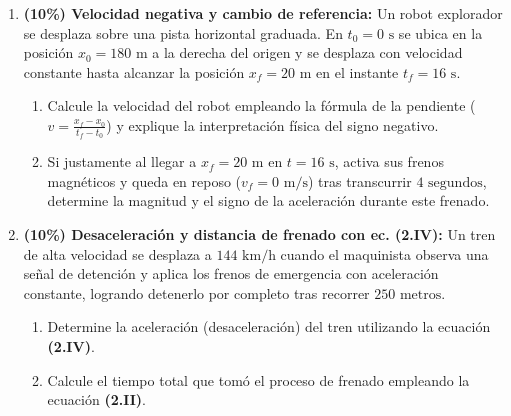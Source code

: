 \documentclass[11pt, letterpaper]{article}
\newif\ifmostrarrespuestas
\newcommand{\respuesta}[1]{
	\ifmostrarrespuestas
	\par\vspace{0.2cm}
	\begin{tcolorbox}[colback=blue!5!white, colframe=valblue, coltext=blue!80!black, boxrule=0.5pt, arc=1mm, left=2mm, right=2mm, top=1.5mm, bottom=1.5mm]
		\footnotesize \textbf{\textcolor{valblue}{Solución Paso a Paso (Docente):}} #1
	\end{tcolorbox}
	\vspace{0.2cm}
	\fi
}
\begin{document}
\begin{enumerate}[leftmargin=*, itemsep=0.6cm]
		\item \textbf{(10\%) Velocidad negativa y cambio de referencia:} Un robot explorador se desplaza sobre una pista horizontal graduada. En $t_0 = 0\text{ s}$ se ubica en la posición $x_0 = 180\text{ m}$ a la derecha del origen y se desplaza con velocidad constante hasta alcanzar la posición $x_f = 20\text{ m}$ en el instante $t_f = 16\text{ s}$.
		\begin{enumerate}[label=\alph*., itemsep=0.2cm]
			\item Calcule la velocidad del robot empleando la fórmula de la pendiente ($v = \frac{x_f - x_0}{t_f - t_0}$) y explique la interpretación física del signo negativo.
			\item Si justamente al llegar a $x_f = 20\text{ m}$ en $t = 16\text{ s}$, activa sus frenos magnéticos y queda en reposo ($v_f = 0\text{ m/s}$) tras transcurrir $4\text{ segundos}$, determine la magnitud y el signo de la aceleración durante este frenado.
		\end{enumerate}
		\respuesta{
			\textbf{a)} $v = \frac{20\text{ m} - 180\text{ m}}{16\text{ s} - 0\text{ s}} = \frac{-160\text{ m}}{16\text{ s}} = \mathbf{-10}\text{ \textbf{m/s}}$. El signo negativo indica que el robot avanza en sentido opuesto al eje positivo del sistema de referencia (regresando hacia el origen $x=0$).\\[0.1cm]
			\textbf{b)} Datos del frenado: $v_0 = -10\text{ m/s}$, $v_f = 0\text{ m/s}$, $t = 4\text{ s}$. Con ec. (2.II): $a = \frac{0 - (-10\text{ m/s})}{4\text{ s}} = \mathbf{+2,5}\text{ \textbf{m/s}}^\mathbf{2}$. La aceleración resulta positiva porque la fuerza de frenado actúa hacia la derecha ($+\hat{i}$) para oponerse al movimiento hacia la izquierda.
		}
		
		\item \textbf{(10\%) Desaceleración y distancia de frenado con ec. (2.IV):} Un tren de alta velocidad se desplaza a $144\text{ km/h}$ cuando el maquinista observa una señal de detención y aplica los frenos de emergencia con aceleración constante, logrando detenerlo por completo tras recorrer $250\text{ metros}$.
		\begin{enumerate}[label=\alph*., itemsep=0.2cm]
			\item Determine la aceleración (desaceleración) del tren utilizando la ecuación \textbf{(2.IV)}.
			\item Calcule el tiempo total que tomó el proceso de frenado empleando la ecuación \textbf{(2.II)}.
		\end{enumerate}
		\respuesta{
			Convertimos: $v_0 = 144\text{ km/h} = 40\text{ m/s}$; $v_f = 0\text{ m/s}$; $\Delta x = 250\text{ m}$.\\[0.1cm]
			\textbf{a)} De $v_f^2 = v_0^2 + 2a\Delta x \implies 0^2 = (40)^2 + 2a(250) \implies -1600 = 500a \implies a = \frac{-1600}{500} = \mathbf{-3,2}\text{ \textbf{m/s}}^\mathbf{2}$.\\[0.1cm]
			\textbf{b)} De $a = \frac{v_f - v_0}{t} \implies t = \frac{0 - 40\text{ m/s}}{-3,2\text{ m/s}^2} = \mathbf{12,5}\text{ \textbf{s}}$.
		}
		

\end{enumerate}
\end{document}
